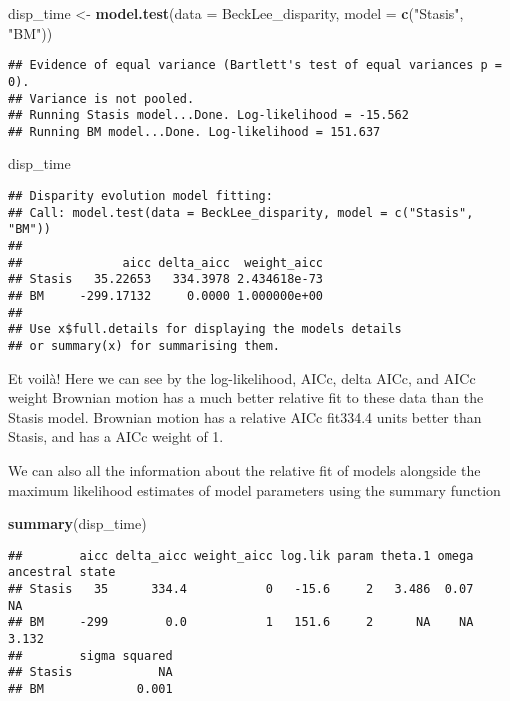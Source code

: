 \documentclass[
]{book}
\newenvironment{Shaded}{\begin{snugshade}}{\end{snugshade}}
\newcommand{\AttributeTok}[1]{\textcolor[rgb]{0.13,0.29,0.53}{#1}}
\newcommand{\FunctionTok}[1]{\textcolor[rgb]{0.13,0.29,0.53}{\textbf{#1}}}
\newcommand{\NormalTok}[1]{#1}
\newcommand{\OtherTok}[1]{\textcolor[rgb]{0.56,0.35,0.01}{#1}}
\newcommand{\StringTok}[1]{\textcolor[rgb]{0.31,0.60,0.02}{#1}}
\begin{document}
\begin{Shaded}
\begin{Highlighting}[]
\NormalTok{disp\_time }\OtherTok{\textless{}{-}} \FunctionTok{model.test}\NormalTok{(}\AttributeTok{data =}\NormalTok{ BeckLee\_disparity,}
                        \AttributeTok{model =} \FunctionTok{c}\NormalTok{(}\StringTok{"Stasis"}\NormalTok{, }\StringTok{"BM"}\NormalTok{))}
\end{Highlighting}
\end{Shaded}

\begin{verbatim}
## Evidence of equal variance (Bartlett's test of equal variances p = 0).
## Variance is not pooled.
## Running Stasis model...Done. Log-likelihood = -15.562
## Running BM model...Done. Log-likelihood = 151.637
\end{verbatim}

\begin{Shaded}
\begin{Highlighting}[]
\NormalTok{disp\_time}
\end{Highlighting}
\end{Shaded}

\begin{verbatim}
## Disparity evolution model fitting:
## Call: model.test(data = BeckLee_disparity, model = c("Stasis", "BM")) 
## 
##              aicc delta_aicc  weight_aicc
## Stasis   35.22653   334.3978 2.434618e-73
## BM     -299.17132     0.0000 1.000000e+00
## 
## Use x$full.details for displaying the models details
## or summary(x) for summarising them.
\end{verbatim}

Et voilà! Here we can see by the log-likelihood, AICc, delta AICc, and AICc weight Brownian motion has a much better relative fit to these data than the Stasis model.
Brownian motion has a relative AICc fit334.4 units better than Stasis, and has a AICc weight of 1.

We can also all the information about the relative fit of models alongside the maximum likelihood estimates of model parameters using the summary function

\begin{Shaded}
\begin{Highlighting}[]
\FunctionTok{summary}\NormalTok{(disp\_time)}
\end{Highlighting}
\end{Shaded}

\begin{verbatim}
##        aicc delta_aicc weight_aicc log.lik param theta.1 omega ancestral state
## Stasis   35      334.4           0   -15.6     2   3.486  0.07              NA
## BM     -299        0.0           1   151.6     2      NA    NA           3.132
##        sigma squared
## Stasis            NA
## BM             0.001
\end{verbatim}
\end{document}
